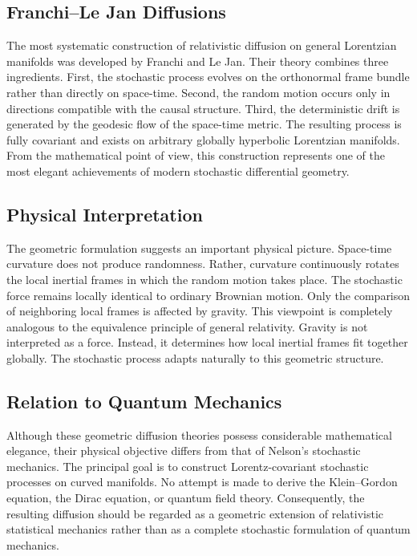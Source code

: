 \subsection{Franchi--Le Jan Diffusions}
The most systematic construction of relativistic diffusion on general
Lorentzian manifolds was developed by Franchi and Le Jan.
Their theory combines three ingredients.
First,
the stochastic process evolves on the orthonormal frame bundle rather
than directly on space-time.
Second,
the random motion occurs only in directions compatible with the causal
structure.
Third,
the deterministic drift is generated by the geodesic flow of the
space-time metric.
The resulting process is fully covariant and exists on arbitrary
globally hyperbolic Lorentzian manifolds.
From the mathematical point of view,
this construction represents one of the most elegant achievements of
modern stochastic differential geometry.
\subsection{Physical Interpretation}
The geometric formulation suggests an important physical picture.
Space-time curvature does not produce randomness.
Rather,
curvature continuously rotates the local inertial frames in which the
random motion takes place.
The stochastic force remains locally identical to ordinary Brownian
motion.
Only the comparison of neighboring local frames is affected by gravity.
This viewpoint is completely analogous to the equivalence principle of
general relativity.
Gravity is not interpreted as a force.
Instead,
it determines how local inertial frames fit together globally.
The stochastic process adapts naturally to this geometric structure.
\subsection{Relation to Quantum Mechanics}
Although these geometric diffusion theories possess considerable
mathematical elegance, their physical objective differs from that of
Nelson's stochastic mechanics.
The principal goal is to construct Lorentz-covariant stochastic
processes on curved manifolds.
No attempt is made to derive the Klein--Gordon equation, the Dirac
equation, or quantum field theory.
Consequently,
the resulting diffusion should be regarded as a geometric extension of
relativistic statistical mechanics rather than as a complete stochastic
formulation of quantum mechanics.
